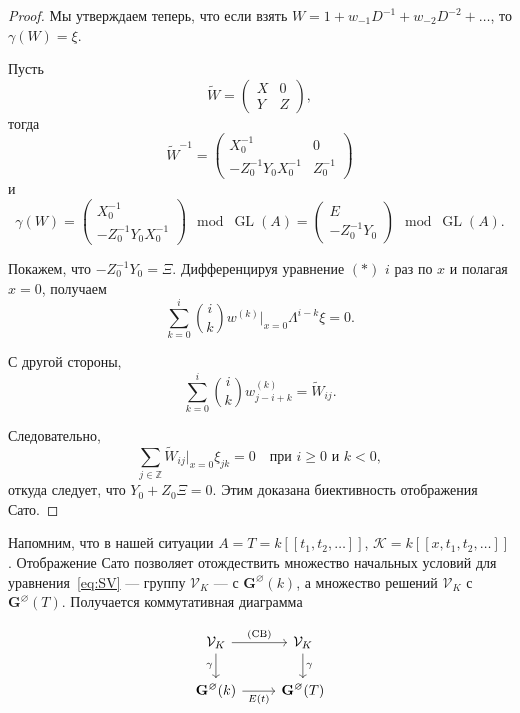 \documentclass{article}
\theoremstyle{definition}
\theoremstyle{definition} %
\theoremstyle{remark}     %
\theoremstyle{definition}
\theoremstyle{definition}
\theoremstyle{definition}
\theoremstyle{definition}
\theoremstyle{definition}
\theoremstyle{definition}
\theoremstyle{definition}
\theoremstyle{definition}
\begin{document}
\begin{proof}
Мы утверждаем теперь, что если взять \( W = 1 + w_{-1}D^{-1} + w_{-2}D^{-2} + \dots \), то \(\gamma(W) = \xi\).

Пусть  
\[
\tilde{W} = 
\begin{pmatrix}
X & 0 \\
Y & Z
\end{pmatrix},
\]
тогда  
\[
\tilde{W}^{-1} = 
\begin{pmatrix}
X_0^{-1} & 0 \\
-Z_0^{-1}Y_0X_0^{-1} & Z_0^{-1}
\end{pmatrix}
\]
и  
\[
\gamma(W) = 
\begin{pmatrix}
X_0^{-1} \\
-Z_0^{-1}Y_0X_0^{-1}
\end{pmatrix} \mod \operatorname{GL}(A) = 
\begin{pmatrix}
E \\
-Z_0^{-1}Y_0
\end{pmatrix} \mod \operatorname{GL}(A).
\]

Покажем, что \(-Z_0^{-1}Y_0 = \Xi\). Дифференцируя уравнение \((*)\) \(i\) раз по \(x\) и полагая \(x = 0\), получаем  
\[
\sum_{k=0}^i \binom{i}{k} w^{(k)} \big|_{x=0} \Lambda^{i-k} \xi = 0.
\]

С другой стороны,  
\[
\sum_{k=0}^i \binom{i}{k} w^{(k)}_{j-i+k} = \tilde{W}_{ij}.
\]

Следовательно,  
\[
\sum_{j \in \mathbb{Z}} \tilde{W}_{ij} \big|_{x=0} \xi_{jk} = 0 \quad \text{при } i \ge 0 \text{ и } k < 0,
\]
откуда следует, что \(Y_0 + Z_0\Xi = 0\). Этим доказана биективность отображения Сато.

\end{proof}



Напомним, что в нашей ситуации \(A = T = k[[t_1, t_2, \dots]]\), \(\mathcal{K} = k[[x, t_1, t_2, \dots]]\). Отображение Сато позволяет отождествить множество начальных условий для уравнения~\ref{eq:SV} — группу \(\mathcal{V}_K\) — с \(\mathbf{G}^\varnothing(k)\), а множество решений \(\mathcal{V}_K\) с \(\mathbf{G}^\varnothing(T)\). Получается коммутативная диаграмма  



\begingroup
{}
\[
\begin{tikzcd}
	\mathcal{V}_K \arrow[r, "\text{(CB)}"] \arrow[d, "\gamma"'] & \mathcal{V}_K \arrow[d, "\gamma"] \\
	\mathbf{G}^\varnothing(k) \arrow[r, "E(t)"'] & \mathbf{G}^\varnothing(T)
\end{tikzcd}
\]
\endgroup
\end{document}
